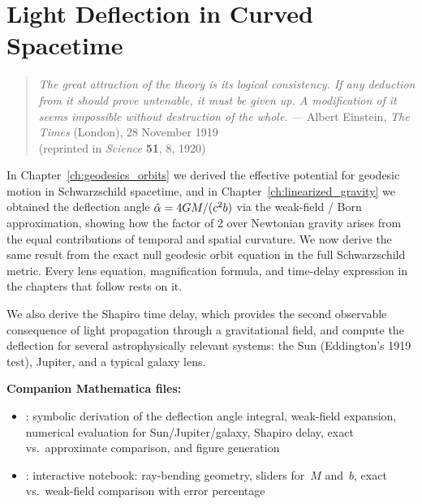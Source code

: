
\chapter{Light Deflection in Curved Spacetime}
\label{ch:light_deflection}

\begin{quote}
\textit{The great attraction of the theory is its logical consistency.  If any
deduction from it should prove untenable, it must be given up.  A
modification of it seems impossible without destruction of the whole.}
\hfill --- Albert Einstein, \textit{The Times} (London), 28 November 1919\\
\hfill (reprinted in \textit{Science} \textbf{51}, 8, 1920)
\end{quote}

\noindent
In Chapter~\ref{ch:geodesics_orbits} we derived the effective potential for geodesic motion in
Schwarzschild spacetime, and in Chapter~\ref{ch:linearized_gravity} we obtained the deflection
angle $\hat{\alpha} = 4G M / (c^2 b)$ via the
weak-field / Born approximation, showing how the factor of 2 over
Newtonian gravity arises from the equal contributions of temporal and
spatial curvature.  We now derive the same result from the exact null
geodesic orbit equation in the full Schwarzschild metric.  Every lens
equation, magnification formula, and time-delay expression in the chapters
that follow rests on it.

We also derive the Shapiro time delay, which provides the second
observable consequence of light propagation through a gravitational field,
and compute the deflection for several astrophysically relevant systems:
the Sun (Eddington's 1919 test), Jupiter, and a typical galaxy lens.

\medskip
\noindent
\textbf{Companion Mathematica files:}
\begin{itemize}[nosep]
    \item {}:
          symbolic derivation of the deflection angle integral,
          weak-field expansion, numerical evaluation for Sun/Jupiter/galaxy,
          Shapiro delay, exact vs.\ approximate comparison, and figure generation
    \item {}:
          interactive notebook: ray-bending geometry, sliders for~$M$
          and~$b$, exact vs.\ weak-field comparison with error percentage
\end{itemize}



